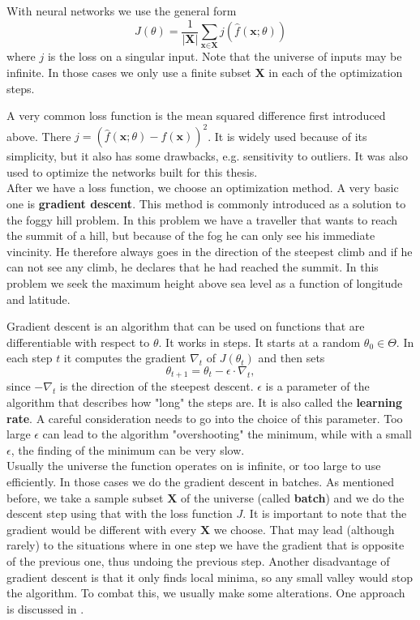 With neural networks we use the general form $$J(\theta) = \frac{1}{|\textbf{X}|} \sum_{\textbf{x}\in \textbf{X}}j(\widehat{f}(\textbf{x};\theta))$$ where $j$ is the loss on a singular input. Note that the universe of inputs may be infinite. In those cases we only use a finite subset $\textbf{X}$ in each of the optimization steps. 

A very common loss function is the mean squared difference first introduced above. There $j=(\widehat{f}(\textbf{x};\theta)-f(\textbf{x}))^2$. It is widely used because of its simplicity, but it also has some drawbacks, e.g. sensitivity to outliers. It was also used to optimize the networks built for this thesis.\\

After we have a loss function, we choose an optimization method. A very basic one is \textbf{gradient descent}. This method is commonly introduced as a solution to the foggy hill problem. In this problem we have a traveller that wants to reach the summit of a hill, but because of the fog he can only see his immediate vincinity. He therefore always goes in the direction of the steepest climb and if he can not see any climb, he declares that he had reached the summit. In this problem we seek the maximum height above sea level as a function of longitude and latitude.

Gradient descent is an algorithm that can be used on functions that are differentiable with respect to $\theta$. It works in steps. It starts at a random $\theta_0 \in \Theta$. In each step $t$ it computes the gradient $\nabla_t$ of $J(\theta_t)$ and then sets $$\theta_{t+1}=\theta_t-\epsilon\cdot\nabla_t,$$ since $-\nabla_t$ is the direction of the steepest descent. $\epsilon$ is a parameter of the algorithm that describes how "long" the steps are. It is also called the \textbf{learning rate}. A careful consideration needs to go into the choice of this parameter. Too large $\epsilon$ can lead to the algorithm "overshooting" the minimum, while with a small $\epsilon$, the finding of the minimum can be very slow.\\

Usually the universe the function operates on is infinite, or too large to use efficiently. In those cases we do the gradient descent in batches. As mentioned before, we take a sample subset $\textbf{X}$ of the universe (called \textbf{batch}) and we do the descent step using that with the loss function $J$. It is important to note that the gradient would be different with every $\textbf{X}$ we choose. That may lead (although rarely) to the situations where in one step we have the gradient that is opposite of the previous one, thus undoing the previous step. Another disadvantage of gradient descent is that it only finds local minima, so any small valley would stop the algorithm. To combat this, we usually make some alterations. One approach is discussed in .

